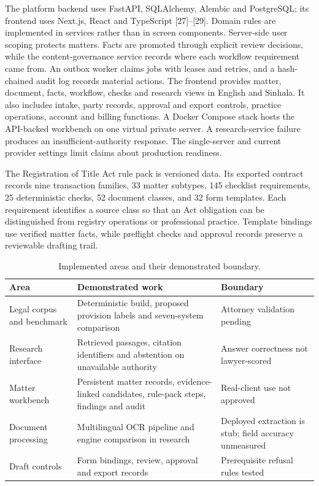 \documentclass[12pt,a4paper]{article}
\begin{document}
The platform backend uses FastAPI, SQLAlchemy, Alembic and PostgreSQL; its frontend uses Next.js, React and TypeScript [27]–[29]. Domain rules are implemented in services rather than in screen components. Server-side user scoping protects matters. Facts are promoted through explicit review decisions, while the content-governance service records where each workflow requirement came from. An outbox worker claims jobs with leases and retries, and a hash-chained audit log records material actions. The frontend provides matter, document, facts, workflow, checks and research views in English and Sinhala. It also includes intake, party records, approval and export controls, practice operations, account and billing functions. A Docker Compose stack hosts the API-backed workbench on one virtual private server. A research-service failure produces an insufficient-authority response. The single-server and current provider settings limit claims about production readiness.


The Registration of Title Act rule pack is versioned data. Its exported contract records nine transaction families, 33 matter subtypes, 145 checklist requirements, 25 deterministic checks, 52 document classes, and 32 form templates. Each requirement identifies a source class so that an Act obligation can be distinguished from registry operations or professional practice. Template bindings use verified matter facts, while preflight checks and approval records preserve a reviewable drafting trail.


\begin{table}[H]
\centering
\caption{Implemented areas and their demonstrated boundary.}
\fontsize{9.5}{11}\selectfont
\begin{tabularx}{\linewidth}{>{\RaggedRight\arraybackslash}X|>{\RaggedRight\arraybackslash}X|>{\RaggedRight\arraybackslash}X}
\toprule
\textbf{Area} & \textbf{Demonstrated work} & \textbf{Boundary} \\
\midrule
Legal corpus and benchmark & Deterministic build, proposed provision labels and seven-system comparison & Attorney validation pending \\
Research interface & Retrieved passages, citation identifiers and abstention on unavailable authority & Answer correctness not lawyer-scored \\
Matter workbench & Persistent matter records, evidence-linked candidates, rule-pack steps, findings and audit & Real-client use not approved \\
Document processing & Multilingual OCR pipeline and engine comparison in research & Deployed extraction is stub; field accuracy unmeasured \\
Draft controls & Form bindings, review, approval and export records & Prerequisite refusal rules tested \\
\bottomrule
\end{tabularx}
\end{table}
\end{document}
